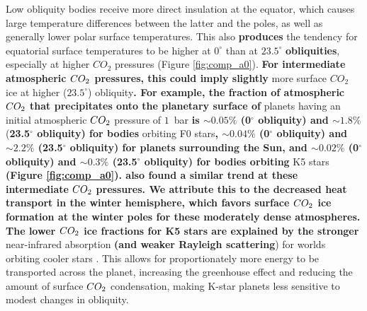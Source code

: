 \documentclass[fleqn,usenatbib]{mnras}
\providecommand{\DIFadd}[1]{{\bf #1}} %
\providecommand{\DIFdel}[1]{} %
\providecommand{\DIFaddbegin}{} %
\providecommand{\DIFaddend}{} %
\providecommand{\DIFdelbegin}{} %
\providecommand{\DIFdelend}{} %
\newcommand{\DIFscaledelfig}{0.5}
\newlength{\DIFdelgraphicswidth} %
\newlength{\DIFdelgraphicsheight} %
\newcommand{\DIFaddincludegraphics}[2][]{{\color{blue}\fbox{\DIFOincludegraphics[#1]{#2}}}} %
\newcommand{\DIFdelincludegraphics}[2][]{%
\sbox{\DIFdelgraphicsbox}{\DIFOincludegraphics[#1]{#2}}%
\settoboxwidth{\DIFdelgraphicswidth}{\DIFdelgraphicsbox} %
\settoboxtotalheight{\DIFdelgraphicsheight}{\DIFdelgraphicsbox} %
\scalebox{\DIFscaledelfig}{%
\parbox[b]{\DIFdelgraphicswidth}{\usebox{\DIFdelgraphicsbox}\\[-\baselineskip] \rule{\DIFdelgraphicswidth}{0em}}\llap{\resizebox{\DIFdelgraphicswidth}{\DIFdelgraphicsheight}{%
\setlength{\unitlength}{\DIFdelgraphicswidth}%
\begin{picture}(1,1)%
\thicklines\linethickness{2pt} %
{\color[rgb]{1,0,0}\put(0,0){\framebox(1,1){}}}%
{\color[rgb]{1,0,0}\put(0,0){\line( 1,1){1}}}%
{\color[rgb]{1,0,0}\put(0,1){\line(1,-1){1}}}%
\end{picture}%
}\hspace*{3pt}}} %
} %
\DeclareRobustCommand{\DIFaddbegin}{\DIFOaddbegin \let\includegraphics\DIFaddincludegraphics} %
\DeclareRobustCommand{\DIFaddend}{\DIFOaddend \let\includegraphics\DIFOincludegraphics} %
\DeclareRobustCommand{\DIFdelbegin}{\DIFOdelbegin \let\includegraphics\DIFdelincludegraphics} %
\DeclareRobustCommand{\DIFdelend}{\DIFOaddend \let\includegraphics\DIFOincludegraphics} %
\begin{document}
Low obliquity bodies receive more direct insulation at the equator, which causes large temperature differences between the latter and the poles, as well as generally lower polar surface temperatures. This also \DIFdelbegin \DIFdel{produced }\DIFdelend \DIFaddbegin \DIFadd{produces }\DIFaddend the tendency for equatorial surface temperatures to be higher at $0^{\circ}$ than at $23.5^{\circ}$ \DIFdelbegin \DIFdel{obliquity}\DIFdelend \DIFaddbegin \DIFadd{obliquities}\DIFaddend , especially at higher $CO_{\mathrm{2}}$ pressures (Figure \ref{fig:comp_a0}). \DIFdelbegin \DIFdel{While this could lead to }\DIFdelend \DIFaddbegin \DIFadd{For intermediate atmospheric $CO_{\rm 2}$ pressures, this could imply slightly }\DIFaddend more surface $CO_{\mathrm{2}}$ ice \DIFdelbegin \DIFdel{being present }\DIFdelend at higher ($23.5^{\circ}$) obliquity\DIFdelbegin \DIFdel{, we find that the portion of precipitated }\DIFdelend \DIFaddbegin \DIFadd{. For example, the fraction of atmospheric }\DIFaddend $CO_{\rm 2}$ \DIFdelbegin \DIFdel{is always higher for low obliquity }\DIFdelend \DIFaddbegin \DIFadd{that precipitates onto the planetary surface of }\DIFaddend planets having an initial atmospheric $CO_{\rm 2}$ pressure of $1$~bar \DIFaddbegin \DIFadd{is $\sim 0.05 \%$ (0$^{\circ}$ obliquity) and $\sim 1.8\%$ }\DIFaddend (\DIFdelbegin \DIFdel{see caption in Figure \ref{fig:comp_a0}) . For example, low and high obliquityplanets }\DIFdelend \DIFaddbegin \DIFadd{23.5$^{\circ}$ obliquity) for bodies }\DIFaddend orbiting F0 stars\DIFdelbegin \DIFdel{end up precipitating $\sim 13 \%$ and $\sim 5\%$ of atmospheric $CO_{\rm 2}$ onto the planetary surface, respectively. Conversely, obliquityvariations have a smaller effect for planets orbiting cooler }\DIFdelend \DIFaddbegin \DIFadd{, $\sim 0.04 \%$ (0$^{\circ}$ obliquity) and $\sim 2.2\%$ (23.5$^{\circ}$ obliquity) for planets surrounding the Sun, and $\sim 0.02 \%$ (0$^{\circ}$ obliquity) and $\sim 0.3\%$ (23.5$^{\circ}$ obliquity) for bodies orbiting }\DIFaddend K5 stars \DIFdelbegin \DIFdel{, for which the surface sequestered similar amounts of atmospheric }\DIFdelend \DIFaddbegin \DIFadd{(Figure \ref{fig:comp_a0}). \citet{Soto2015} also found a similar trend at these intermediate }\DIFaddend $CO_{\rm 2}$ \DIFdelbegin \DIFdel{at the two tilt angles ($\sim 0.1 \%$ at low and $\sim 0.4\%$ at high obliquity). This is because }\DIFdelend \DIFaddbegin \DIFadd{pressures. We attribute this to the decreased heat transport in the winter hemisphere, which favors surface $CO_{\rm 2}$ ice formation at the winter poles for these moderately dense atmospheres. The lower $CO_{\rm 2}$ ice fractions for K5 stars are explained by the stronger }\DIFaddend near-infrared absorption  \DIFdelbegin \DIFdel{is stronger (and Rayleigh scattering is weaker}\DIFdelend \DIFaddbegin \DIFadd{(and weaker Rayleigh scattering}\DIFaddend ) for worlds orbiting cooler stars \citep{kasting1993}. This allows for proportionately more energy to be transported across the planet, increasing the greenhouse effect and reducing the amount of surface $CO_{\rm 2}$ condensation, making K-star planets less sensitive to modest changes in obliquity.
\end{document}
